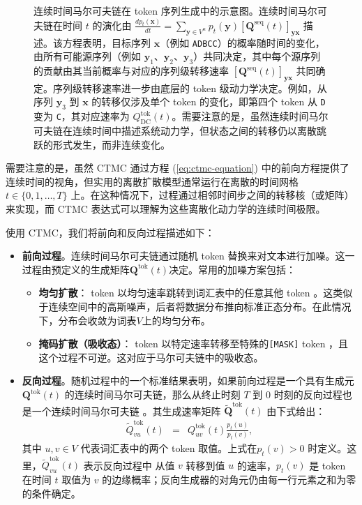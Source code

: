 \documentclass[UTF8,a4paper,zihao=-4,oneside,openany]{ctexbook}
\makeatletter
\newcommand{\AMLFigure}[2][0.96\linewidth]{%
  \begingroup
  \let\AtBeginDocument\@gobble
  \endgroup
}
\makeatother
\begin{document}
\begin{figure}[!t]
\centering
\AMLFigure{figure-ctmc-for-sequence-generation}
\caption{连续时间马尔可夫链在 token 序列生成中的示意图。连续时间马尔可夫链在时间 $t$ 的演化由 $\frac{d p_t(\mathbf{x})}{dt} = \sum_{\mathbf{y} \in V^n} p_t(\mathbf{y}) [\mathbf{Q}^{\mathrm{seq}}(t)]_{\mathbf{y}\mathbf{x}}$ 描述。该方程表明，目标序列 $\mathbf{x}$（例如 \texttt{ADBCC}）的概率随时间的变化，由所有可能源序列（例如 $\mathbf{y}_1$、$\mathbf{y}_2$、$\mathbf{y}_3$）共同决定，其中每个源序列的贡献由其当前概率与对应的序列级转移速率 $[\mathbf{Q}^{\mathrm{seq}}(t)]_{\mathbf{y}\mathbf{x}}$ 共同确定。序列级转移速率进一步由底层的 token 级动力学决定。例如，从序列 $\mathbf{y}_3$ 到 $\mathbf{x}$ 的转移仅涉及单个 token 的变化，即第四个 token 从 \texttt{D} 变为 \texttt{C}，其对应速率为 $Q^{\mathrm{tok}}_{\mathrm{DC}}(t)$。需要注意的是，虽然连续时间马尔可夫链在连续时间中描述系统动力学，但状态之间的转移仍以离散跳跃的形式发生，而非连续变化。}
\label{fig:ctmc-for-sequence-generation}
\end{figure}

需要注意的是，虽然 CTMC 通过方程 (\ref{eq:ctmc-equation}) 中的前向方程提供了连续时间的视角，但实用的离散扩散模型通常运行在离散的时间网格 $t \in \{0,1,\dots,T\}$ 上。在这种情况下，过程通过相邻时间步之间的转移核（或矩阵）来实现，而 CTMC 表达式可以理解为这些离散化动力学的连续时间极限。

使用 CTMC，我们将前向和反向过程描述如下：

\begin{itemize}
\item \textbf{前向过程}。连续时间马尔可夫链通过随机 token 替换来对文本进行加噪。这一过程由预定义的生成矩阵$\mathbf{Q}^{\mathrm{tok}}(t)$决定。常用的加噪方案包括：
    \begin{itemize}
    \item \textbf{均匀扩散}： token 以均匀速率跳转到词汇表中的任意其他 token 。这类似于连续空间中的高斯噪声，后者将数据分布推向标准正态分布。在此情况下，分布会收敛为词表$V$上的均匀分布。
    \item \textbf{掩码扩散（吸收态）}： token 以特定速率转移至特殊的\texttt{[MASK]} token ，且这个过程不可逆。这对应于马尔可夫链中的吸收态。
    \end{itemize}
\item \textbf{反向过程}。随机过程中的一个标准结果表明，如果前向过程是一个具有生成元 $\mathbf{Q}^{\mathrm{tok}}(t)$ 的连续时间马尔可夫链，那么从终止时刻 $T$ 到 $0$ 时刻的反向过程也是一个连续时间马尔可夫链 \citep{anderson:1982reverse}。其生成速率矩阵 $\tilde{\mathbf{Q}}^{\mathrm{tok}}(t)$ 由下式给出：
\begin{eqnarray}
\tilde{Q}^{\mathrm{tok}}_{vu}(t) & = & Q^{\mathrm{tok}}_{uv}(t) \frac{p_t(u)}{p_t(v)}, \label{eq:reverse-ctmc}
\end{eqnarray}
\noindent 其中 $u, v \in V$ 代表词汇表中的两个 token 取值。上式在$p_t(v)>0$ 时定义。这里，$\tilde{Q}^{\mathrm{tok}}_{vu}(t)$ 表示反向过程中
从值 $v$ 转移到值 $u$ 的速率，$p_t(v)$ 是 token 在时间 $t$ 取值为 $v$
的边缘概率；反向生成器的对角元仍由每一行元素之和为零的条件确定。
\end{itemize}
\end{document}
